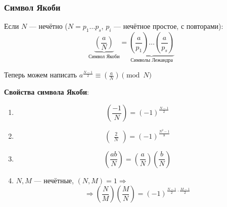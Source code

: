 \subsubsection{Символ Якоби}
\begin{definition}
Если $N$ --- нечётно ($N = p_1 \ldots p_s$, $p_i$ --- нечётное простое, с повторами):
\[
    \underbrace{\left(\frac{a}{N}\right)}_{\text{Символ Якоби}} = \underbrace{\left(\frac{a}{p_1}\right) \ldots \left(\frac{a}{p_s}\right)}_{\text{Символы Лежандра}}
\]
\end{definition}
\begin{note}
    Теперь можем написать $a^{\frac{N - 1}{2}} \equiv \left(\frac{a}{N}\right) \pmod N$
\end{note}
\textbf{Свойства символа Якоби}:
\begin{enumerate}
    \item \[
    \left(\frac{-1}{N}\right) = (-1)^{\frac{N - 1}{2}}
    \]
\item \[
   \begin{pmatrix}\frac{2}{N} \end{pmatrix} = (-1)^{\frac{N^{2} - 1}{8}}
\]
\item \[
    \left(\frac{ab}{N}\right) = \left(\frac{a}{N}\right)\left(\frac{b}{N}\right)
\]
\item $N, M$ --- нечётные, $(N, M) = 1 \Rightarrow$
    \[
    \Rightarrow \left(\frac{N}{M}\right)\left(\frac{M}{N}\right) = (-1)^{\frac{N - 1}{2}\cdot \frac{M - 1}{2}}
    \]
\end{enumerate}
